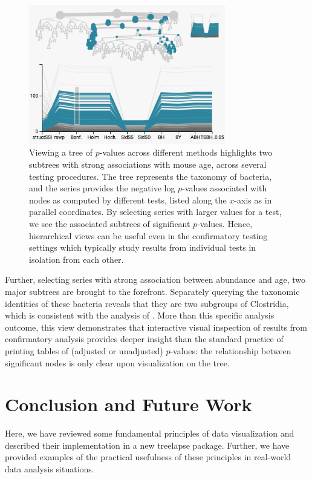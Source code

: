 \documentclass[12pt]{article}
\begin{document}
\begin{figure}

{\centering \includegraphics[width=325px]{figure/structssi}

}

\caption{Viewing a tree of $p$-values across different methods highlights two
  subtrees with strong associations with mouse age, across several testing
  procedures. The tree represents the taxonomy of bacteria, and the series
  provides the negative log $p$-values associated with nodes as computed by
  different tests, listed along the $x$-axis as in parallel coordinates. By
  selecting series with larger values for a test, we see the associated subtrees
  of significant $p$-values. Hence, hierarchical views can be useful even in the
  confirmatory testing settings which typically study results from individual
  tests in isolation from each other.\label{fig:structssi}}
\end{figure}

Further, selecting series with strong association between abundance and age, two
major subtrees are brought to the forefront. Separately querying the
taxonomic identities of these bacteria reveals that they are two subgroups of
Clostridia, which is consistent with the analysis of
\citep{callahan2016bioconductor}. More than this specific analysis outcome, this
view demonstrates that interactive visual inspection of results from
confirmatory analysis provides deeper insight than the standard practice of
printing tables of (adjusted or unadjusted) $p$-values: the relationship between
significant nodes is only clear upon visualization on the tree.

\section{Conclusion and Future Work}\label{conclusion}

Here, we have reviewed some fundamental principles of data visualization and
described their implementation in a new treelapse package. Further, we have
provided examples of the practical usefulness of these principles in real-world
data analysis situations.
\end{document}
